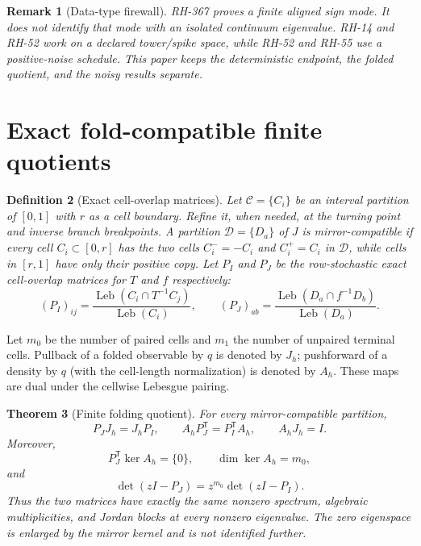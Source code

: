 \documentclass[11pt]{article}
\newtheorem{theorem}{Theorem}[section]
\newtheorem{remark}[theorem]{Remark}
\newtheorem{definition}[theorem]{Definition}
\newcommand{\J}{J}
\newcommand{\Leb}{\operatorname{Leb}}
\begin{document}
\begin{remark}[Data-type firewall]
RH-367 proves a finite aligned sign mode.  It does not identify that mode
with an isolated continuum eigenvalue.  RH-14 and RH-52 work on a declared
tower/spike space, while RH-52 and RH-55 use a positive-noise schedule.  This
paper keeps the deterministic endpoint, the folded quotient, and the noisy
results separate.
\end{remark}

\section{Exact fold-compatible finite quotients}

\begin{definition}[Exact cell-overlap matrices]
Let $\mathcal C=\{C_i\}$ be an interval partition of $[0,1]$ with $r$ as a
cell boundary.  Refine it, when needed, at the turning point and inverse
branch breakpoints.  A partition $\mathcal D=\{D_a\}$ of $\J$ is
\emph{mirror-compatible} if every cell $C_i\subset[0,r]$ has the two cells
$C_i^-= -C_i$ and $C_i^+=C_i$ in $\mathcal D$, while cells in $[r,1]$ have
only their positive copy.  Let $P_I$ and $P_J$ be the row-stochastic exact
cell-overlap matrices for $T$ and $f$ respectively:
\begin{equation}
 (P_I)_{ij}=\frac{\Leb(C_i\cap T^{-1}C_j)}{\Leb(C_i)},\qquad
 (P_J)_{ab}=\frac{\Leb(D_a\cap f^{-1}D_b)}{\Leb(D_a)}.
 \label{eq:ulam}
\end{equation}
\end{definition}

Let $m_0$ be the number of paired cells and $m_1$ the number of unpaired
terminal cells.  Pullback of a folded observable by $q$ is denoted by $J_h$;
pushforward of a density by $q$ (with the cell-length normalization) is
denoted by $A_h$.  These maps are dual under the cellwise Lebesgue pairing.

\begin{theorem}[Finite folding quotient]
\label{thm:quotient}
For every mirror-compatible partition,
\begin{equation}
 P_JJ_h=J_hP_I,\qquad A_hP_J^{\mathsf T}=P_I^{\mathsf T}A_h,
 \qquad A_hJ_h=I.
 \label{eq:intertwining}
\end{equation}
Moreover,
\begin{equation}
 P_J^{\mathsf T}\ker A_h=\{0\},\qquad \dim\ker A_h=m_0,
 \label{eq:kernel}
\end{equation}
and
\begin{equation}
 \det(zI-P_J)=z^{m_0}\det(zI-P_I).
 \label{eq:charfactor}
\end{equation}
Thus the two matrices have exactly the same nonzero spectrum, algebraic
multiplicities, and Jordan blocks at every nonzero eigenvalue.  The zero
eigenspace is enlarged by the mirror kernel and is not identified further.
\end{theorem}
\end{document}
